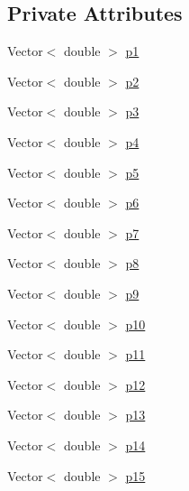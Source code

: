 \subsection*{Private Attributes}
\begin{DoxyCompactItemize}
\item 
Vector$<$ double $>$ \hyperlink{classoomph_1_1CylinderWithFlagDomain_a22098b556345f035ddacbdf9ea1f7076}{p1}
\item 
Vector$<$ double $>$ \hyperlink{classoomph_1_1CylinderWithFlagDomain_a518fb98d53857ffd86d1cac4c23db0d9}{p2}
\item 
Vector$<$ double $>$ \hyperlink{classoomph_1_1CylinderWithFlagDomain_a6327976b3d8e582cfc232be01c45d975}{p3}
\item 
Vector$<$ double $>$ \hyperlink{classoomph_1_1CylinderWithFlagDomain_a060890ea588f8e5833d518fa707fe774}{p4}
\item 
Vector$<$ double $>$ \hyperlink{classoomph_1_1CylinderWithFlagDomain_ad4f4179e51afb966f11b999ef9ddd0a9}{p5}
\item 
Vector$<$ double $>$ \hyperlink{classoomph_1_1CylinderWithFlagDomain_a8af35f3606195d1bab1da58102b7fa15}{p6}
\item 
Vector$<$ double $>$ \hyperlink{classoomph_1_1CylinderWithFlagDomain_ae0aaa23dad312e7ea308e98b59015a51}{p7}
\item 
Vector$<$ double $>$ \hyperlink{classoomph_1_1CylinderWithFlagDomain_a20743a18902498e2537f557da2fec123}{p8}
\item 
Vector$<$ double $>$ \hyperlink{classoomph_1_1CylinderWithFlagDomain_a8ff949c600451d8cc9e53fc9b204dd79}{p9}
\item 
Vector$<$ double $>$ \hyperlink{classoomph_1_1CylinderWithFlagDomain_af9fe7cd9299c2fe162804d60455609c6}{p10}
\item 
Vector$<$ double $>$ \hyperlink{classoomph_1_1CylinderWithFlagDomain_af209469424b0b515eedb4587901453b6}{p11}
\item 
Vector$<$ double $>$ \hyperlink{classoomph_1_1CylinderWithFlagDomain_a8cd9138a4f584d439da6264e5aa65d2e}{p12}
\item 
Vector$<$ double $>$ \hyperlink{classoomph_1_1CylinderWithFlagDomain_af96f841048a399c0d5b7cd4519c22d72}{p13}
\item 
Vector$<$ double $>$ \hyperlink{classoomph_1_1CylinderWithFlagDomain_ac07282a9f587fc6f10b81506c59a2001}{p14}
\item 
Vector$<$ double $>$ \hyperlink{classoomph_1_1CylinderWithFlagDomain_a3ddcf9eca20ac5f31358b9711fef5a09}{p15}
\item 

\end{DoxyCompactItemize}
